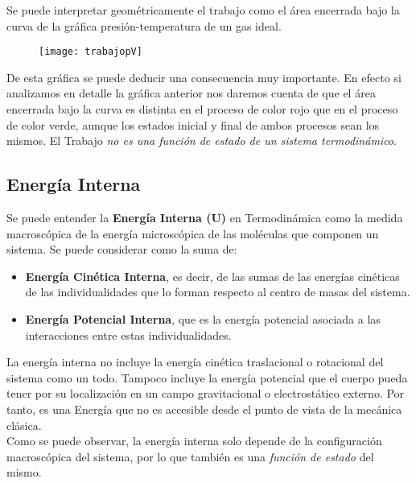 Se puede interpretar geométricamente el trabajo como el área encerrada bajo la curva de la gráfica presión-temperatura de un gas ideal.

\begin{figure}[h!]
	\centering
	\texttt{[image: trabajopV]}
\end{figure}

De esta gráfica se puede deducir una consecuencia muy importante. En efecto si analizamos en detalle la gráfica anterior nos daremos cuenta de que el área encerrada bajo la curva es distinta en el proceso de color rojo que en el proceso de color verde, aunque los estados inicial y final de ambos procesos sean los mismos. El Trabajo \emph{no es una función de estado de un sistema termodinámico}.\\

\subsection{Energía Interna}

Se puede entender la \textbf{Energía Interna (U)} en Termodinámica como la medida macroscópica de la energía microscópica de las moléculas que componen un sistema. Se puede considerar como la suma de:\\

\begin{itemize}
	
	\item \textbf{Energía Cinética Interna}, es decir, de las sumas de las energías cinéticas de las individualidades que lo forman respecto al centro de masas del sistema.\\
	
	\item  \textbf{Energía Potencial Interna}, que es la energía potencial asociada a las interacciones entre estas individualidades.\\
	
\end{itemize}

La energía interna no incluye la energía cinética traslacional o rotacional del sistema como un todo. Tampoco incluye la energía potencial que el cuerpo pueda tener por su localización en un campo gravitacional o electrostático externo. Por tanto, es una Energía que no es accesible desde el punto de vista de la mecánica clásica.\\

Como se puede observar, la energía interna solo depende de la configuración macroscópica del sistema, por lo que también es una \emph{función de estado} del mismo. 

